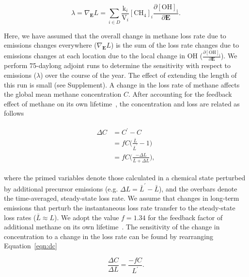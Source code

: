 \begin{equation}
\lambda = \nabla_\mathbf{E} L = \sum_{i \in D} \frac{\mathrm{k}_i}{\mathrm{V}_i} \mathrm{[CH_4]}_i \frac{\partial \mathrm{[OH]_i}}{\partial \mathbf{E}}.
\label{eqn:dlde}
\end{equation}

Here, we have assumed that the overall change in methane loss rate due to emissions changes everywhere ($\nabla_\mathbf{E} L$) is the sum of the loss rate changes due to emissions changes at each location due to the local change in OH ($\frac{\partial \mathrm{[OH]_i}}{\partial \mathbf{E}}$). We perform 75-daylong adjoint runs to determine the sensitivity with respect to emissions ($\lambda$) over the course of the year. The effect of extending the length of this run is small (see Supplement). A change in the loss rate of methane affects the global mean methane concentration $C$. After accounting for the feedback effect of methane on its own lifetime~\citep{ref:fuglestvedt1999,ref:naik2005}, the concentration and loss are related as follows

\begin{equation}
\begin{align}
\begin{split}
\Delta C &= C^{\prime} - C \\
         &= f C \Big(\frac{\bar{L}}{\bar{L}^{\prime}} - 1\Big) \\
         &= fC\Big(\frac{-\Delta L}{\bar{L}+\Delta L}\Big),
\end{split}
\label{eqn:dc}
\end{align}
\end{equation}

where the primed variables denote those calculated in a chemical state perturbed by additional precursor emissions (e.g. $\Delta L = \bar{L}^{\prime}-\bar{L}$), and the overbars denote the time-averaged, steady-state loss rate. We assume that changes in long-term emissions that perturb the instantaneous loss rate transfer to the steady-state loss rates ($\bar{L} \approx L$).  We adopt the value $f=1.34$ for the feedback factor of additional methane on its own lifetime~\citep{ref:holmes2013}. The sensitivity of the change in concentration to a change in the loss rate can be found by rearranging Equation~\ref{eqn:dc}

\begin{equation}
\frac{\Delta C}{\Delta L} = \frac{-fC}{L^{\prime}}.
\label{eqn:dcdl}
\end{equation}

